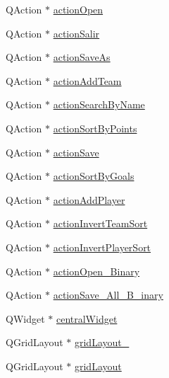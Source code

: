 \begin{DoxyCompactItemize}
\item 
Q\+Action $\ast$ \hyperlink{class_ui___main_window_a5772f39001f62b7f601aafe72caa10c0}{action\+Open}
\item 
Q\+Action $\ast$ \hyperlink{class_ui___main_window_aa6bf8b15f3c451eb9203cb68a6bddaf4}{action\+Salir}
\item 
Q\+Action $\ast$ \hyperlink{class_ui___main_window_ae55672d2aed40288e40d98af42c58bed}{action\+Save\+As}
\item 
Q\+Action $\ast$ \hyperlink{class_ui___main_window_a11f8049e0775309806c29c8035b22dc9}{action\+Add\+Team}
\item 
Q\+Action $\ast$ \hyperlink{class_ui___main_window_a3f7b044a1ed56764c16128450b5f19af}{action\+Search\+By\+Name}
\item 
Q\+Action $\ast$ \hyperlink{class_ui___main_window_ad5f709428798c8ba5beb7d87385ad343}{action\+Sort\+By\+Points}
\item 
Q\+Action $\ast$ \hyperlink{class_ui___main_window_a6e14788227f1a0dbc8cf983514685f3b}{action\+Save}
\item 
Q\+Action $\ast$ \hyperlink{class_ui___main_window_a4cc2ad71f8673961bf716a9c474b76fa}{action\+Sort\+By\+Goals}
\item 
Q\+Action $\ast$ \hyperlink{class_ui___main_window_af1f8925b955d4b219fed6f1a99b06cdd}{action\+Add\+Player}
\item 
Q\+Action $\ast$ \hyperlink{class_ui___main_window_af3f0c8c84ceccf3a8a9d6e0199f00d37}{action\+Invert\+Team\+Sort}
\item 
Q\+Action $\ast$ \hyperlink{class_ui___main_window_a9c9d44d9b3ad2a992e269ecc2125bac7}{action\+Invert\+Player\+Sort}
\item 
Q\+Action $\ast$ \hyperlink{class_ui___main_window_a0e6df36b7fce5ae045699046ff0d9e0d}{action\+Open\+\_\+\+Binary}
\item 
Q\+Action $\ast$ \hyperlink{class_ui___main_window_ae175ad32cb4c943ec815bb8e19963da0}{action\+Save\+\_\+\+All\+\_\+\+B\+\_\+inary}
\item 
Q\+Widget $\ast$ \hyperlink{class_ui___main_window_a30075506c2116c3ed4ff25e07ae75f81}{central\+Widget}
\item 
Q\+Grid\+Layout $\ast$ \hyperlink{class_ui___main_window_a6b2a0c5f7e8ff2a87134908dd770d2d2}{grid\+Layout\+\_}
\item 
Q\+Grid\+Layout $\ast$ \hyperlink{class_ui___main_window_a525ed3c5fe0784ac502ee222fba4e205}{grid\+Layout}
\item 

\end{DoxyCompactItemize}
